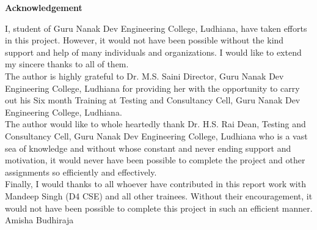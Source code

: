 \begin{center}
{\Huge \bf{Acknowledgement}\vskip 0.2in}
\end{center}

I, student of Guru Nanak Dev Engineering College, Ludhiana, have taken efforts in this project.
However, it would not have been possible without the kind support and help of many individuals
and organizations. I would like to extend my sincere thanks to all of them.\\

The author is highly grateful to Dr. M.S. Saini Director, Guru Nanak Dev Engineering College, Ludhiana for providing her with the opportunity to carry out his Six month Training at
Testing and Consultancy Cell, Guru Nanak Dev Engineering College, Ludhiana.\\



The author would like to whole heartedly thank Dr. H.S. Rai Dean, Testing and Consultancy
Cell, Guru Nanak Dev Engineering College, Ludhiana who is a vast sea of knowledge and without whose constant and never ending support and motivation, it would never have been possible to complete the project and other assignments so efficiently and effectively.\\

Finally, I would thanks to all whoever have contributed in this report work with Mandeep Singh
(D4 CSE) and all other trainees. Without their encouragement, it would not have been possible
to complete this project in such an efficient manner.\\


\vskip 1.0cm 
\noindent Amisha Budhiraja




